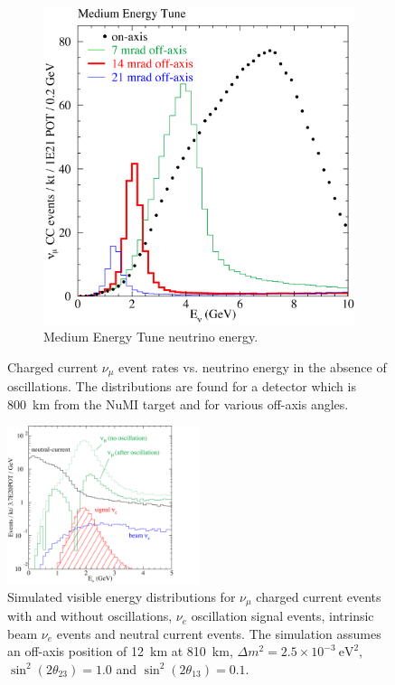 \begin{figure}
\begin{subfigure}[b]{0.45\textwidth}
    \includegraphics[width=\textwidth]{../../img/baird/beam/050-me-spectra.png}
    \caption{Medium Energy Tune neutrino energy.}
    \label{fig:NuESpectra_MEAndLE_b}
  \end{subfigure}
  \caption{Charged current $\nu_{\mu}$ event rates vs. neutrino
    energy in the absence of oscillations. The distributions are found
  for a detector which is 800~km from the NuMI target and for various
  off-axis angles.~\cite{TDR}}
  \label{fig:NuESpectra_MEAndLE}
\end{figure}


\begin{figure}
  \centering
  \includegraphics[width=0.5\textwidth]{../../img/beam/060-sig-and-bg-rates-thumb.png}
  \caption{Simulated visible energy distributions for $\nu_{\mu}$ charged current
    events with and without oscillations, $\nu_e$ oscillation signal events,
    intrinsic beam $\nu_e$ events and neutral current events. The
    simulation assumes an off-axis position of 12~km at 810~km, $\Delta m^2 = 2.5 \times 10^{-3}
    ~\textrm{eV}^2$, $\sin^2(2\theta_{23}) = 1.0$ and
  $\sin^2(2\theta_{13}) = 0.1$.~\cite{TDR}}
  \label{fig:NuMIBeamComp}
\end{figure}


